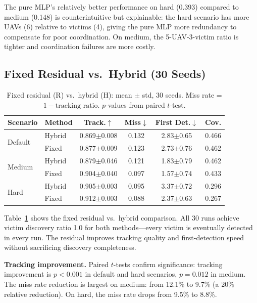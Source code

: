 \documentclass[journal]{IEEEtran}
\begin{document}
The pure MLP's relatively better performance on hard (0.393) compared to medium (0.148)
is counterintuitive but explainable: the hard scenario has more UAVs (6) relative to
victims (4), giving the pure MLP more redundancy to compensate for poor coordination.
On medium, the 5-UAV-3-victim ratio is tighter and coordination failures are more costly.

\subsection{Fixed Residual vs.\ Hybrid (30 Seeds)}
\label{sec:fixed_results}

\begin{table}[t]
\centering
\caption{Fixed residual (R) vs.\ hybrid (H): mean $\pm$ std, 30 seeds.
Miss rate = $1 - \text{tracking ratio}$. $p$-values from paired $t$-test.}
\label{tab:fixed_vs_hybrid}
\small
\begin{tabular}{@{}llcccc@{}}
\toprule
Scenario & Method & Track.$\uparrow$ & Miss$\downarrow$ & First Det.$\downarrow$ & Cov. \\
\midrule
\multirow{2}{*}{Default}
  & Hybrid & 0.869$\pm$0.008 & 0.132 & 2.83$\pm$0.65 & 0.466 \\
  & Fixed  & 0.877$\pm$0.009 & 0.123 & 2.73$\pm$0.76 & 0.462 \\
\midrule
\multirow{2}{*}{Medium}
  & Hybrid & 0.879$\pm$0.046 & 0.121 & 1.83$\pm$0.79 & 0.462 \\
  & Fixed  & 0.904$\pm$0.040 & 0.097 & 1.57$\pm$0.74 & 0.433 \\
\midrule
\multirow{2}{*}{Hard}
  & Hybrid & 0.905$\pm$0.003 & 0.095 & 3.37$\pm$0.72 & 0.296 \\
  & Fixed  & 0.912$\pm$0.003 & 0.088 & 2.37$\pm$0.63 & 0.267 \\
\bottomrule
\end{tabular}
\end{table}

Table~\ref{tab:fixed_vs_hybrid} shows the fixed residual vs.\ hybrid comparison.
All 30 runs achieve victim discovery ratio 1.0 for both methods---every victim is
eventually detected in every run. The residual improves tracking quality and
first-detection speed without sacrificing discovery completeness.

\textbf{Tracking improvement.} Paired $t$-tests confirm significance: tracking
improvement is $p < 0.001$ in default and hard scenarios, $p = 0.012$ in medium.
The miss rate reduction is largest on medium: from 12.1\% to 9.7\% (a 20\% relative
reduction). On hard, the miss rate drops from 9.5\% to 8.8\%.
\end{document}
